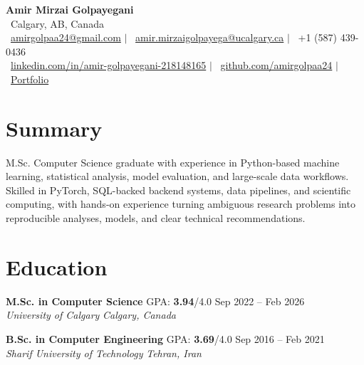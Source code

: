 \documentclass[a4paper,10pt]{article}
\newcommand{\resumeEducationSubheading}[5]{
    \textbf{#1} \hfill #2 \hfill #3 \\
    \textit{#4} \hfill \textit{#5}
}
\begin{document}

\begin{center}
    {\LARGE \textbf{Amir Mirzai Golpayegani}} \\[0.25em]
    \faMapMarker*~Calgary, AB, Canada \\[0.25em]
    \faEnvelope~\href{mailto:amirgolpaa24@gmail.com}{amirgolpaa24@gmail.com}
    $|$
    \faEnvelope~\href{mailto:amir.mirzaigolpayega@ucalgary.ca}{amir.mirzaigolpayega@ucalgary.ca}
    $|$
    \faPhone*~+1 (587) 439-0436 \\[0.25em]
    \faLinkedin~\href{https://linkedin.com/in/amir-golpayegani-218148165}{linkedin.com/in/amir-golpayegani-218148165}
    $|$
    \faGithub~\href{https://github.com/amirgolpaa24}{github.com/amirgolpaa24}
    $|$
    \faGlobe~\href{https://amir-portfolio-navy.vercel.app/}{Portfolio}
\end{center}


\section*{Summary}

M.Sc. Computer Science graduate with experience in Python-based machine learning, statistical analysis, model evaluation, and large-scale data workflows. Skilled in PyTorch, SQL-backed backend systems, data pipelines, and scientific computing, with hands-on experience turning ambiguous research problems into reproducible analyses, models, and clear technical recommendations.


\section*{Education}

\resumeEducationSubheading
{M.Sc. in Computer Science}
{GPA: \textbf{3.94}/4.0}
{Sep 2022 -- Feb 2026}
{University of Calgary}
{Calgary, Canada}

\vspace{0.35em}

\resumeEducationSubheading
{B.Sc. in Computer Engineering}
{GPA: \textbf{3.69}/4.0}
{Sep 2016 -- Feb 2021}
{Sharif University of Technology}
{Tehran, Iran}

\end{document}
